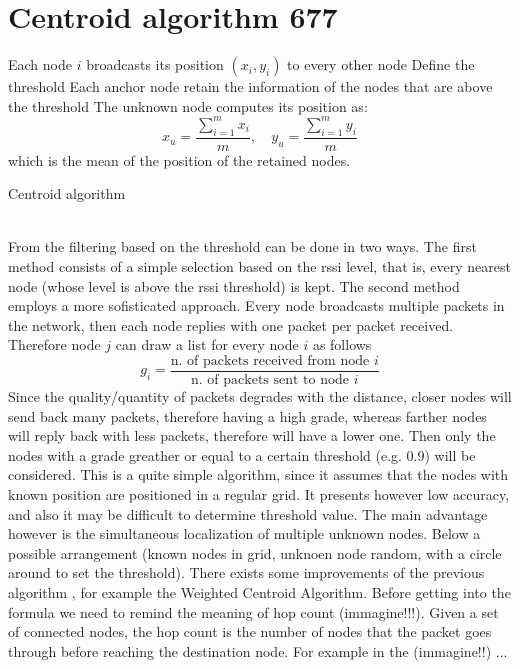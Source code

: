 \documentclass[12pt,twoside]{report}
\begin{document}
\section{Centroid algorithm 677}
\begin{algorithm}[H]
\SetAlgoLined
{}
 Each node $i$ broadcasts its position $(x_i,y_i)$ to every other node\;
 Define the threshold\;
 Each anchor node retain the information of the nodes that are above the threshold\;
 The unknown node computes its position as:
 \begin{equation}
     x_u=\frac{\sum_{i=1}^mx_i}{m},\quad y_u=\frac{\sum_{i=1}^my_i}{m}
 \end{equation}
 which is the mean of the position of the retained nodes.
 \caption{Centroid algorithm}
\end{algorithm}
\noindent\\From \cite{878533} the filtering based on the threshold can be done in two ways. The first method consists of a simple selection based on the rssi level, that is, every nearest node (whose level is above the rssi threshold) is kept. The second method employs a more sofisticated approach. Every node broadcasts multiple packets in the network, then each node replies with one packet per packet received. Therefore node $j$ can draw a list for every node $i$ as follows 
\begin{equation}
    g_i = \frac{\text{n. of packets received from node $i$}}{\text{n. of packets sent to node $i$}}
\end{equation}
Since the quality/quantity of packets degrades with the distance, closer nodes will send back many packets, therefore having a high grade, whereas farther nodes will reply back with less packets, therefore will have a lower one. Then only the nodes with a grade greather or equal to a certain threshold (e.g. $0.9$) will be considered. This is a quite simple algorithm, since it assumes that the nodes with known position are positioned in a regular grid. It presents however low accuracy, and also it may be difficult to determine threshold value. The main advantage however is the simultaneous localization of multiple unknown nodes. Below a possible arrangement (known nodes in grid, unknoen node random, with a circle around to set the threshold). There exists some improvements of the previous algorithm \cite{KAUR201982}, for example the Weighted Centroid Algorithm. Before getting into the formula we need to remind the meaning of hop count (immagine!!!). Given a set of connected nodes, the hop count is the number of nodes that the packet goes through before reaching the destination node. For example in the (immagine!!) ... 
\end{document}
